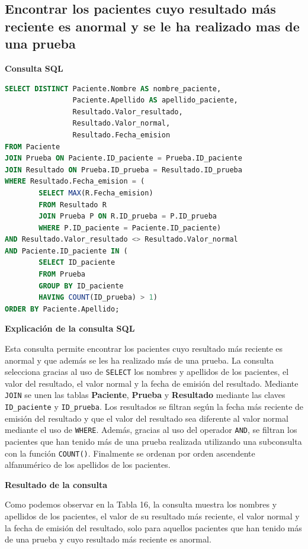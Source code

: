 \documentclass[spanish]{article}
\begin{document}
\subsection{Encontrar los pacientes cuyo resultado más reciente es anormal y se le ha realizado mas de una prueba}

\textbf{Consulta SQL}
\begin{lstlisting}[language=SQL]
SELECT DISTINCT Paciente.Nombre AS nombre_paciente, 
                Paciente.Apellido AS apellido_paciente, 
                Resultado.Valor_resultado,
                Resultado.Valor_normal,
                Resultado.Fecha_emision
FROM Paciente
JOIN Prueba ON Paciente.ID_paciente = Prueba.ID_paciente
JOIN Resultado ON Prueba.ID_prueba = Resultado.ID_prueba
WHERE Resultado.Fecha_emision = (
        SELECT MAX(R.Fecha_emision)
        FROM Resultado R
        JOIN Prueba P ON R.ID_prueba = P.ID_prueba
        WHERE P.ID_paciente = Paciente.ID_paciente)
AND Resultado.Valor_resultado <> Resultado.Valor_normal
AND Paciente.ID_paciente IN (
        SELECT ID_paciente
        FROM Prueba
        GROUP BY ID_paciente
        HAVING COUNT(ID_prueba) > 1)
ORDER BY Paciente.Apellido;
\end{lstlisting}

\textbf{Explicación de la consulta SQL}

Esta consulta permite encontrar los pacientes cuyo resultado más reciente es anormal y que además se les ha realizado más de una prueba. La consulta selecciona gracias al uso de \texttt{SELECT} los nombres y apellidos de los pacientes, el valor del resultado, el valor normal y la fecha de emisión del resultado. Mediante \texttt{JOIN} se unen las tablas \textbf{Paciente}, \textbf{Prueba} y \textbf{Resultado} mediante las claves \texttt{ID\_paciente} y \texttt{ID\_prueba}. Los resultados se filtran según la fecha más reciente de emisión del resultado y que el valor del resultado sea diferente al valor normal mediante el uso de \texttt{WHERE}. Además, gracias al uso del operador \texttt{AND}, se filtran los pacientes que han tenido más de una prueba realizada utilizando una subconsulta con la función \texttt{COUNT()}. Finalmente se ordenan por orden ascendente alfanumérico de los apellidos de los pacientes. 

\textbf{Resultado de la consulta}

Como podemos observar en la Tabla 16, la consulta muestra los nombres y apellidos de los pacientes, el valor de su resultado más reciente, el valor normal y la fecha de emisión del resultado, solo para aquellos pacientes que han tenido más de una prueba y cuyo resultado más reciente es anormal.
\end{document}
